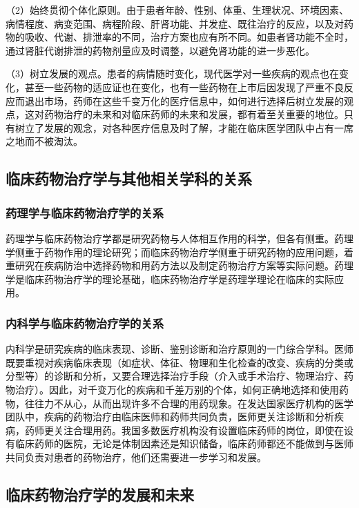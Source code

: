 （2）始终贯彻个体化原则。由于患者年龄、性别、体重、生理状况、环境因素、病情程度、病变范围、病程阶段、肝肾功能、并发症、既往治疗的反应，以及对药物的吸收、代谢、排泄率的不同，治疗方案也应有所不同。如患者肾功能不全时，通过肾脏代谢排泄的药物剂量应及时调整，以避免肾功能的进一步恶化。

（3）树立发展的观点。患者的病情随时变化，现代医学对一些疾病的观点也在变化，甚至一些药物的适应证也在变化，也有一些药物在上市后因发现了严重不良反应而退出市场，药师在这些千变万化的医疗信息中，如何进行选择后树立发展的观点，这对药物治疗的未来和对临床药师的未来和发展，都有着至关重要的地位。只有树立了发展的观念，对各种医疗信息及时了解，才能在临床医学团队中占有一席之地而不被淘汰。

\subsection{临床药物治疗学与其他相关学科的关系}

\subsubsection{药理学与临床药物治疗学的关系}

药理学与临床药物治疗学都是研究药物与人体相互作用的科学，但各有侧重。药理学侧重于药物作用的理论研究；而临床药物治疗学侧重于研究药物的应用问题，着重研究在疾病防治中选择药物和用药方法以及制定药物治疗方案等实际问题。药理学是临床药物治疗学的理论基础，临床药物治疗学是药理学理论在临床的实际应用。

\subsubsection{内科学与临床药物治疗学的关系}

内科学是研究疾病的临床表现、诊断、鉴别诊断和治疗原则的一门综合学科。医师既要重视对疾病临床表现（如症状、体征、物理和生化检查的改变、疾病的分类或分型等）的诊断和分析，又要合理选择治疗手段（介入或手术治疗、物理治疗、药物治疗）。因此，对千变万化的疾病和千差万别的个体，如何正确地选择和使用药物，往往力不从心，从而出现许多不合理的用药现象。在发达国家医疗机构的医学团队中，疾病的药物治疗由临床医师和药师共同负责，医师更关注诊断和分析疾病，药师更关注合理用药。我国多数医疗机构没有设置临床药师的岗位，即使在设有临床药师的医院，无论是体制因素还是知识储备，临床药师都还不能做到与医师共同负责对患者的药物治疗，他们还需要进一步学习和发展。

\subsection{临床药物治疗学的发展和未来}

